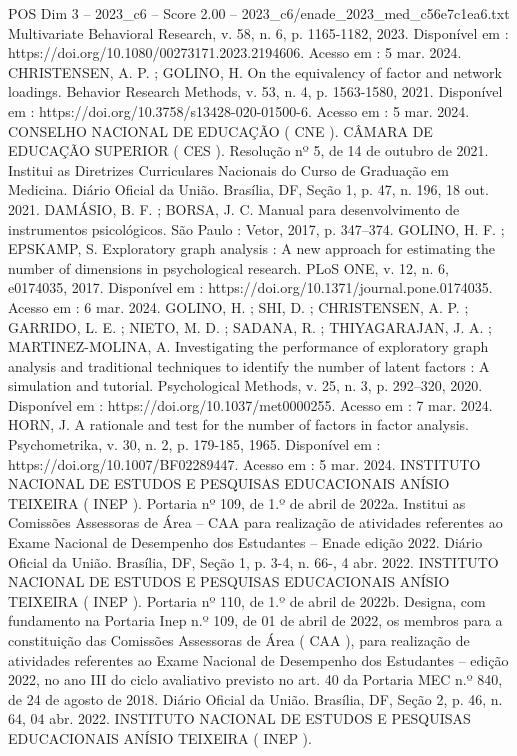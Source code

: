 \begin{textsample}{POS Dim 3 – 2023\_c6 – Score 2.00 – 2023\_c6/enade\_2023\_med\_c56e7c1ea6.txt}
Multivariate Behavioral Research, v. 58, n. 6, p. 1165-1182, 2023.
Disponível em : https://doi.org/10.1080/00273171.2023.2194606.
Acesso em : 5 mar. 2024.
CHRISTENSEN, A.
P. ; GOLINO, H.
On the equivalency of factor and network loadings.
Behavior Research Methods, v. 53, n. 4, p. 1563-1580, 2021.
Disponível em : https://doi.org/10.3758/s13428-020-01500-6.
Acesso em : 5 mar. 2024.
CONSELHO NACIONAL DE EDUCAÇÃO ( CNE ).
CÂMARA DE EDUCAÇÃO SUPERIOR ( CES ).
Resolução nº 5, de 14 de outubro de 2021.
Institui as Diretrizes Curriculares Nacionais do Curso de Graduação em Medicina.
Diário Oficial da União.
Brasília, DF, Seção 1, p. 47, n. 196, 18 out. 2021.
DAMÁSIO, B.
F. ; BORSA, J.
C.
Manual para desenvolvimento de instrumentos psicológicos.
São Paulo : Vetor, 2017, p. 347–374.
GOLINO, H.
F. ; EPSKAMP, S.
Exploratory graph analysis : A new approach for estimating the number of dimensions in psychological research.
PLoS ONE, v. 12, n. 6, e0174035, 2017.
Disponível em : https://doi.org/10.1371/journal.pone.0174035.
Acesso em : 6 mar. 2024.
GOLINO, H. ; SHI, D. ; CHRISTENSEN, A.
P. ; GARRIDO, L.
E. ; NIETO, M.
D. ; SADANA, R. ; THIYAGARAJAN, J.
A. ; MARTINEZ-MOLINA, A.
Investigating the performance of exploratory graph analysis and traditional techniques to identify the number of latent factors : A simulation and tutorial.
Psychological Methods, v. 25, n. 3, p. 292–320, 2020.
Disponível em : https://doi.org/10.1037/met0000255.
Acesso em : 7 mar. 2024.
HORN, J.
A rationale and test for the number of factors in factor analysis.
Psychometrika, v. 30, n. 2, p. 179-185, 1965.
Disponível em : https://doi.org/10.1007/BF02289447.
Acesso em : 5 mar. 2024.
INSTITUTO NACIONAL DE ESTUDOS E PESQUISAS EDUCACIONAIS ANÍSIO TEIXEIRA ( INEP ).
Portaria nº 109, de 1.º de abril de 2022a.
Institui as Comissões Assessoras de Área – CAA para realização de atividades referentes ao Exame Nacional de Desempenho dos Estudantes – Enade edição 2022.
Diário Oficial da União.
Brasília, DF, Seção 1, p. 3-4, n. 66-, 4 abr. 2022.
INSTITUTO NACIONAL DE ESTUDOS E PESQUISAS EDUCACIONAIS ANÍSIO TEIXEIRA ( INEP ).
Portaria nº 110, de 1.º de abril de 2022b.
Designa, com fundamento na Portaria Inep n.º 109, de 01 de abril de 2022, os membros para a constituição das Comissões Assessoras de Área ( CAA ), para realização de atividades referentes ao Exame Nacional de Desempenho dos Estudantes – edição 2022, no ano III do ciclo avaliativo previsto no art. 40 da Portaria MEC n.º 840, de 24 de agosto de 2018.
Diário Oficial da União.
Brasília, DF, Seção 2, p. 46, n. 64, 04 abr. 2022.
INSTITUTO NACIONAL DE ESTUDOS E PESQUISAS EDUCACIONAIS ANÍSIO TEIXEIRA ( INEP ).

\end{textsample}
